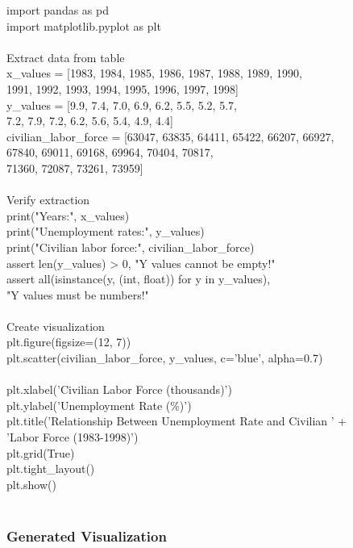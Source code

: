 import pandas as pd \\
import matplotlib.pyplot as plt \\
\\
 Extract data from table \\
x\_values = [1983, 1984, 1985, 1986, 1987, 1988, 1989, 1990, \\
            1991, 1992, 1993, 1994, 1995, 1996, 1997, 1998] \\
y\_values = [9.9, 7.4, 7.0, 6.9, 6.2, 5.5, 5.2, 5.7, \\
            7.2, 7.9, 7.2, 6.2, 5.6, 5.4, 4.9, 4.4] \\
civilian\_labor\_force = [63047, 63835, 64411, 65422, 66207, 66927, \\
                        67840, 69011, 69168, 69964, 70404, 70817, \\
                        71360, 72087, 73261, 73959] \\
\\
 Verify extraction \\
print("Years:", x\_values) \\
print("Unemployment rates:", y\_values) \\
print("Civilian labor force:", civilian\_labor\_force) \\
assert len(y\_values) > 0, "Y values cannot be empty!" \\
assert all(isinstance(y, (int, float)) for y in y\_values), \ \\
      "Y values must be numbers!" \\
\\
 Create visualization \\
plt.figure(figsize=(12, 7)) \\
plt.scatter(civilian\_labor\_force, y\_values, c='blue', alpha=0.7) \\
\\
plt.xlabel('Civilian Labor Force (thousands)') \\
plt.ylabel('Unemployment Rate (\%)') \\
plt.title('Relationship Between Unemployment Rate and Civilian ' + \\
          'Labor Force (1983-1998)') \\
plt.grid(True) \\
plt.tight\_layout() \\
plt.show() \\
\\

\subsubsection{Generated Visualization}

